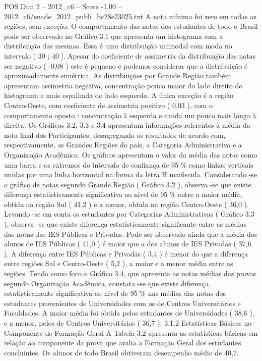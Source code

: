\begin{textsample}{POS Dim 2 – 2012\_c6 – Score -1.00 – 2012\_c6/enade\_2012\_publi\_bc28e23025.txt}
A nota mínima foi zero em todas as regiões, sem exceção.
O comportamento das notas dos estudantes de todo o Brasil pode ser observado no Gráfico 3.1 que apresenta um histograma com a distribuição das mesmas.
Essa é uma distribuição unimodal com moda no intervalo ( 30 ; 40 ].
Apesar do coeficiente de assimetria da distribuição das notas ser negativo ( -0,08 ) este é pequeno e podemos considerar que a distribuição é aproximadamente simétrica.
As distribuições por Grande Região também apresentam assimetria negativa, concentração pouco maior do lado direito do histograma e mais espalhada do lado esquerdo.
A única exceção é a região Centro-Oeste, com coeficiente de assimetria positivo ( 0,03 ), com o comportamento oposto : concentração à esquerda e cauda um pouco mais longa à direita.
Os Gráficos 3.2, 3.3 e 3.4 apresentam informações referentes à média da nota final dos Participantes, desagregando os resultados de acordo com, respectivamente, as Grandes Regiões do país, a Categoria Administrativa e a Organização Acadêmica.
Os gráficos apresentam o valor da média das notas como uma barra e os extremos do intervalo de confiança de 95 \% como linhas verticais unidas por uma linha horizontal na forma da letra H maiúscula.
Considerando -se o gráfico de notas segundo Grande Região ( Gráfico 3.2 ), observa -se que existe diferença estatisticamente significativa ao nível de 95 \% entre a maior média, obtida na região Sul ( 41,2 ) e a menor, obtida na região Centro-Oeste ( 36,0 ).
Levando -se em conta os estudantes por Categorias Administrativas ( Gráfico 3.3 ), observa -se que existe diferença estatisticamente significante entre as médias das notas das IES Públicas e Privadas.
Pode ser observado ainda que a média dos alunos de IES Públicas ( 41,0 ) é maior que a dos alunos de IES Privadas ( 37,6 ).
A diferença entre IES Públicas e Privadas ( 3,4 ) é menor do que a diferença entre regiões Sul e Centro-Oeste ( 5,2 ), a maior e a menor média entre as regiões.
Tendo como foco o Gráfico 3.4, que apresenta as notas médias das provas segundo Organização Acadêmica, constata -se que existe diferença estatisticamente significativa ao nível de 95 \% nas médias das notas dos estudantes provenientes de Universidades com os de Centros Universitários e Faculdades.
A maior média foi obtida pelos estudantes de Universidades ( 38,6 ), e a menor, pelos de Centros Universitários ( 36,7 ). 3.1.2 Estatísticas Básicas no Componente de Formação Geral A Tabela 3.2 apresenta as estatísticas básicas em relação ao componente da prova que avalia a Formação Geral dos estudantes concluintes.
Os alunos de todo Brasil obtiveram desempenho médio de 40,7.

\end{textsample}
